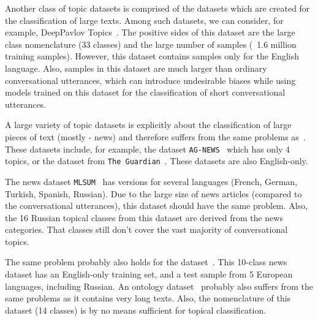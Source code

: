 Another class of topic datasets is comprised of the datasets which are created for the classification of large texts. Among such datasets, we can consider, for example, DeepPavlov Topics~\cite{dp_topics}. The positive sides of this dataset are the large class nomenclature (33 classes) and the large number of samples (~1.6 million training samples). However, this dataset contains samples only for the English language. Also, samples in this dataset are much larger than ordinary conversational utterances, which can introduce undesirable biases while using models trained on this dataset for the classification of short conversational utterances.
\iffalse
For 4 class dp topics:
en & 5,731,625 & 0 & 74.6 & 75.6 & 94.2 & 91.4 & 93.6 & 86.4 & 79.3 & 78.1 & 82.1 & 76.9\\ \hline
en & 5,731,625 & 1 & 77.5 & 78.1 & 93.7 & 90.8 & 94.0 & 86.9 & 81.5 & 80.1 & 85.8 & 82.5\\ \hline

For 3 class dp topics:
en & 5,731,625 & 0 & 88.0 & 87.7 & 93.8 & 92.9 & 94.1 & 90.8 & 88.1 & 88.1\\ \hline
en & 5,731,625 & 1 & 88.4 & 87.8 & 93.9 & 93.0 & 93.9 & 90.1 & 89.0 & 89.0\\ \hline
\fi


A large variety of topic datasets is explicitly about the classification of large pieces of text (mostly - news) and therefore suffers from the same problems as~\cite{dp_topics}. 
These datasets include, for example, the dataset \texttt{AG-NEWS}~\cite{ag_news} which has only 4 topics, or the dataset from \texttt{The Guardian}~\cite{guardian_authorship}. These datasets are also English-only. 

The news dataset \texttt{MLSUM}~\cite{mlsum} has versions for several languages (French, German, Turkish, Spanish, Russian). Due to the large size of news articles (compared to the conversational utterances), this dataset should have the same problem. Also, the 16 Russian topical classes from this dataset are derived from the news categories. That classes still don't cover the vast majority of conversational topics. 

The same problem probably also holds for the dataset~\cite{xglue}. This 10-class news dataset has an English-only training set, and a test sample from 5 European languages, including Russian. 
An ontology dataset~\cite{dbpedia} probably also suffers from the same problems as it contains very long texts. Also, the nomenclature of this dataset (14 classes) is by no means sufficient for topical classification. 


